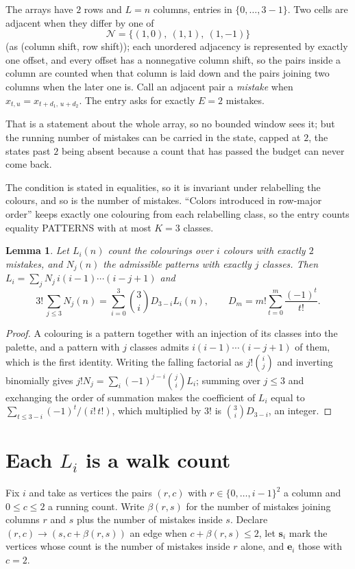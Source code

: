 \documentclass[11pt,a4paper]{article}
\theoremstyle{plain}
\newtheorem{lemma}[theorem]{Lemma}
\theoremstyle{definition}
\begin{document}
The arrays have $2$ rows and $L=n$ columns, entries in $\{0,\dots,3-1\}$.
Two cells are adjacent when they differ by one of
\[
\mathcal N=\{(1,0),\ (1,1),\ (1,-1)\}
\]
(as (column shift, row shift)); each unordered adjacency is represented by exactly one
offset, and every offset has a nonnegative column shift, so the pairs inside a column are
counted when that column is laid down and the pairs joining two columns when the later one
is. Call an adjacent pair a \emph{mistake} when $x_{t,u}=x_{t+d_1,\,u+d_2}$. The entry asks for exactly
$E=2$ mistakes.

That is a statement about the whole array, so no bounded window sees it; but the running
number of mistakes can be carried in the state, capped at $2$, the states past $2$ being
absent because a count that has passed the budget can never come back.

The condition is stated in equalities, so it is invariant under relabelling the colours, and
so is the number of mistakes. ``Colors introduced in row-major order'' keeps exactly one
colouring from each relabelling class, so the entry counts equality PATTERNS with at most
$K=3$ classes.

\begin{lemma}\label{lem:inv}
Let $L_i(n)$ count the colourings over $i$ colours with exactly $2$ mistakes, and $N_j(n)$
the admissible patterns with exactly $j$ classes. Then
$L_i=\sum_j N_j\,i(i-1)\cdots(i-j+1)$ and
\[
3!\,\sum_{j\le3}N_j(n)=\sum_{i=0}^{3}\binom{3}{i}D_{3-i}L_i(n),
\qquad D_m=m!\sum_{t=0}^{m}\frac{(-1)^t}{t!} .
\]
\end{lemma}

\begin{proof}
A colouring is a pattern together with an injection of its classes into the palette, and a
pattern with $j$ classes admits $i(i-1)\cdots(i-j+1)$ of them, which is the first identity.
Writing the falling factorial as $j!\binom{i}{j}$ and inverting binomially gives
$j!N_j=\sum_i(-1)^{j-i}\binom{j}{i}L_i$; summing over $j\le3$ and exchanging the order
of summation makes the coefficient of $L_i$ equal to $\sum_{t\le3-i}(-1)^t/(i!\,t!)$,
which multiplied by $3!$ is $\binom{3}{i}D_{3-i}$, an integer.
\end{proof}

\section{Each $L_i$ is a walk count}

Fix $i$ and take as vertices the pairs $(r,c)$ with $r\in\{0,\dots,i-1\}^{2}$ a column
and $0\le c\le2$ a running count. Write $\beta(r,s)$ for the number of mistakes joining
columns $r$ and $s$ plus the number of mistakes inside $s$. Declare $(r,c)\to(s,c+\beta(r,s))$
an edge when $c+\beta(r,s)\le2$, let $\mathbf{s}_i$ mark the vertices whose count is the
number of mistakes inside $r$ alone, and $\mathbf{e}_i$ those with $c=2$.
\end{document}
